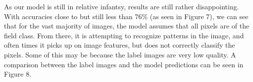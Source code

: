 \documentclass[12pt]{article}
\begin{document}
As our model is still in relative infantsy, results are still rather disappointing. With accuracies close to but still less than 76\% (as seen in Figure 7), we can see that for the vast majority of images, the model assumes that all pixels are of the field class. From there, it is attempting to recognize patterns in the image, and often times it picks up on image features, but does not correctly classify the pixels. Some of this may be because the label images are very low quality. A comparison between the label images and the model predictions can be seen in Figure 8.

\begin{figure}[!htb]
\end{figure}

\begin{figure}[!htb]
\end{figure}
\end{document}
